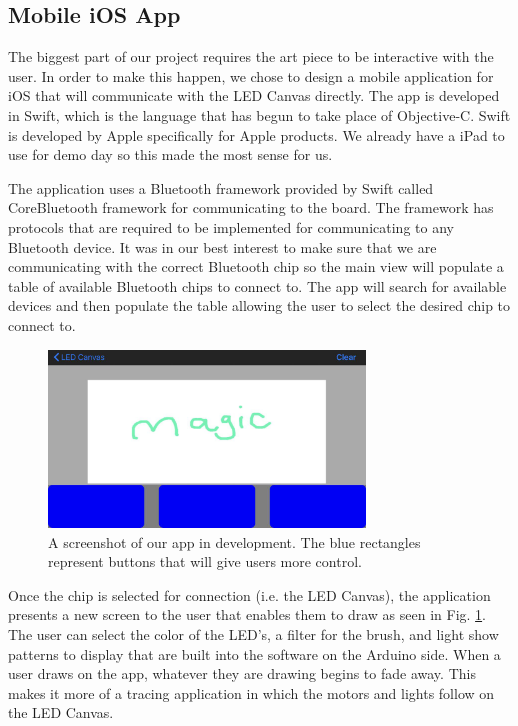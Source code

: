\documentclass[12pt]{article}
\begin{document}
\subsection{Mobile iOS App}
The biggest part of our project requires the art piece to be interactive with the user. In order to make this happen, we chose to design a mobile application for iOS that will communicate with the LED Canvas directly. The app is developed in Swift, which is the language that has begun to take place of Objective-C. Swift is developed by Apple specifically for Apple products. We already have a iPad to use for demo day so this made the most sense for us.

The application uses a Bluetooth framework provided by Swift called CoreBluetooth framework for communicating to the board. The framework has protocols that are required to be implemented for communicating to any Bluetooth device. It was in our best interest to make sure that we are communicating with the correct Bluetooth chip so the main view will populate a table of available Bluetooth chips to connect to. The app will search for available devices and then populate the table allowing the user to select the desired chip to connect to.

\begin{figure}[H]
  \centering
  \includegraphics[width=0.75\textwidth]{image3.png}
  \caption{A screenshot of our app in development. The blue rectangles represent buttons that will give users more control.}
  \label{fig:iosapp}
\end{figure}

Once the chip is selected for connection (i.e. the LED Canvas), the application presents a new screen to the user that enables them to draw as seen in Fig. \ref{fig:iosapp}. The user can select the color of the LED’s, a filter for the brush, and light show patterns to display that are built into the software on the Arduino side. When a user draws on the app, whatever they are drawing begins to fade away. This makes it more of a tracing application in which the motors and lights follow on the LED Canvas.
\end{document}
